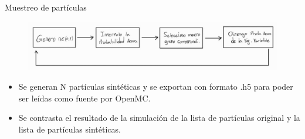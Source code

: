\documentclass[aspectratio=169,english]{beamer}
\begin{document}
\begin{frame}{Muestreo de partículas}
    \begin{figure}
        \centering
        \includegraphics[width=0.95\linewidth]{imagens/esquema5.jpeg}
        \label{fig:esquema5}
    \end{figure}

    \begin{itemize}
        \item Se generan N partículas sintéticas y se exportan con formato .h5 para poder ser leídas como fuente por OpenMC.
        \item Se contrasta el resultado de la simulación de la lista de partículas original y la lista de partículas sintéticas.
    \end{itemize}

\end{frame}
\end{document}
